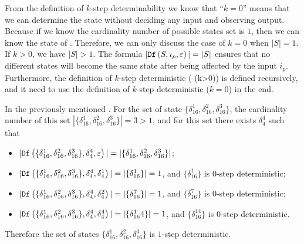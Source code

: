 From the definition of {\em$k$}-step determinability we know that ``$k=0$'' means that we can determine the state without deciding any input and observing output. Because if we know the cardinality number of possible states set is $1$, then we can know the state of \BCNs. Therefore, we can only discuss the case of $k=0$ when $|S|=1$. If $k>0$, we have $|S|>1$. The formula $|{\tt Df}\left(S,i_p,\varepsilon\right)|=|S|$ ensures that no different states will become the same state after being affected by the input $i_p$. Furthermore, the definition of $k$-step deterministic ( (k>0)) is defined recursively, and it need to use the definition of $k$-step deterministic ($k=0$) in the end. 
\begin{example}
In the previously mentioned \BCN. For the set of state $\{\delta_{16}^1,\delta_{16}^2,\delta_{16}^3\}$, the cardinality number of this set $|\{\delta_{16}^1,\delta_{16}^2,\delta_{16}^3\}|=3>1$, and for this set there exists $\delta_{4}^4$ such that 
 \begin{itemize}
 \item  $|{\tt Df}\left(\{\delta_{16}^1,\delta_{16}^2,\delta_{16}^3\},\delta_{4}^4,\varepsilon\right)|=|\{\delta_{16}^1,\delta_{16}^2,\delta_{16}^3\}|$;
 \item  $|{\tt Df}\left(\{\delta_{16}^1,\delta_{16}^2,\delta_{16}^3\},\delta_{4}^4,\delta_{4}^1\right)|=|\{\delta_{16}^1\}|=1$, and $\{\delta_{16}^1\}$ is $0$-step deterministic;
 \item  $|{\tt Df}\left(\{\delta_{16}^1,\delta_{16}^2,\delta_{16}^3\},\delta_{4}^4,\delta_{4}^2\right)|=|\{\delta_{16}^7\}|=1$, and $\{\delta_{16}^7\}$ is $0$-step deterministic;
  \item  $|{\tt Df}\left(\{\delta_{16}^1,\delta_{16}^2,\delta_{16}^3\},\delta_{4}^4,\delta_{4}^4\right)|=|\{\delta_{16}^14\}|=1$, and $\{\delta_{16}^14\}$ is $0$-step deterministic.
 \end{itemize}
 Therefore the set of states $\{\delta_{16}^1,\delta_{16}^2,\delta_{16}^3\}$ is $1$-step deterministic.
\end{example}  

